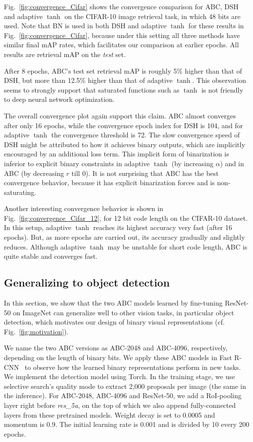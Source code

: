 \documentclass[runningheads]{llncs}
\begin{document}
Fig.~\ref{fig:convergence_Cifar} shows the convergence comparison for ABC, DSH and adaptive $\tanh$ on the CIFAR-10 image retrieval task, in which 48 bits are used. Note that BN is used in both DSH and adaptive $\tanh$ for these results in Fig.~\ref{fig:convergence_Cifar}, because under this setting all three methods have similar final mAP rates, which facilitates our comparison at earlier epochs. All results are retrieval mAP on the \emph{test} set.

After 8 epochs, ABC's test set retrieval mAP is roughly 5\% higher than that of DSH, but more than 12.5\% higher than that of adaptive $\tanh$. This observation seems to strongly support that saturated functions such as $\tanh$ is not friendly to deep neural network optimization. 

The overall convergence plot again support this claim. ABC almost converges after only 16 epochs, while the convergence epoch index for DSH is 104, and for adaptive $\tanh$ the convergence threshold is 72. The slow convergence speed of DSH might be attributed to how it achieves binary outputs, which are implicitly encouraged by an additional loss term. This implicit form of binarization is inferior to explicit binary constraints in adaptive $\tanh$ (by increasing $\alpha$) and in ABC (by decreasing $r$ till 0). It is not surprising that ABC has the best convergence behavior, because it has explicit binarization forces and is non-saturating.

Another interesting convergence behavior is shown in Fig.~\ref{fig:convergence_Cifar_12}, for 12 bit code length on the CIFAR-10 dataset. In this setup, adaptive $\tanh$ reaches its highest accuracy very fast (after 16 epochs). But, as more epochs are carried out, its accuracy gradually and slightly reduces. Although adaptive $\tanh$ may be unstable for short code length, ABC is quite stable and converges fast.

\subsection{Generalizing to object detection} \label{sec:exp:detection}

In this section, we show that the two ABC models learned by fine-tuning ResNet-50 on ImageNet can generalize well to other vision tasks, in particular object detection, which motivates our design of binary visual representations (cf. Fig.~\ref{fig:motivation}).

We name the two ABC versions as ABC-2048 and ABC-4096, respectively, depending on the length of binary bits. We apply these ABC models in Fast R-CNN~\cite{fastrcnn} to observe how the learned binary representations perform in new tasks. We implement the detection model using Torch. In the training stage, we use selective search's quality mode to extract 2,000 proposals per image (the same in the inference). For ABC-2048, ABC-4096 and ResNet-50, we add a RoI-pooling~\cite{fastrcnn} layer right before {\em res\_{5a}}, on the top of which we also append fully-connected layers from these pretrained models. Weight decay is set to 0.0005 and momentum is 0.9. The initial learning rate is 0.001 and is divided by 10 every 200 epochs.
\end{document}
